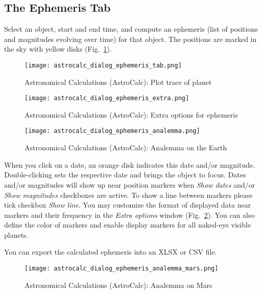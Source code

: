 \subsection{The Ephemeris Tab}
\label{sec:gui:AstroCalc:Ephemeris}

Select an object, start and end time, and compute an ephemeris (list of positions and magnitudes evolving over time) for that object. 
The positions are marked in the sky with yellow disks (Fig.~\ref{fig:gui:AstroCalc:Ephemeris}). 

\begin{figure}[p]
	\centering\texttt{[image: astrocalc\_dialog\_ephemeris\_tab.png]}
	\caption{Astronomical Calculations (AstroCalc): Plot trace of planet}
	\label{fig:gui:AstroCalc:Ephemeris}
\end{figure}

\begin{figure}[p]
	\centering\texttt{[image: astrocalc\_dialog\_ephemeris\_extra.png]}
	\caption{Astronomical Calculations (AstroCalc): Extra options for ephemeris}
	\label{fig:gui:AstroCalc:Ephemeris:Extra}
\end{figure}

\begin{figure}[p]
	\centering\texttt{[image: astrocalc\_dialog\_ephemeris\_analemma.png]}
	\caption{Astronomical Calculations (AstroCalc): Analemma on the Earth}
	\label{fig:gui:AstroCalc:Ephemeris:Analemma}
\end{figure}


When you click on a date, an orange disk indicates this date and/or magnitude. 
Double-clicking sets the respective date and brings the object to focus. 
Dates and/or magnitudes will show up near position markers when \emph{Show dates} 
and/or \emph{Show magnitudes} checkboxes are active.  
To show a line between markers please tick checkbox \emph{Show line}. 
You may customize the format of displayed data near markers and their frequency in the \emph{Extra options} window (Fig.~\ref{fig:gui:AstroCalc:Ephemeris:Extra}).
You can also define the color of markers and enable display markers for all naked-eye visible planets.

You can export the calculated ephemeris into an XLSX or CSV file. 

\begin{figure}[p]
	\centering\texttt{[image: astrocalc\_dialog\_ephemeris\_analemma\_mars.png]}
	\caption{Astronomical Calculations (AstroCalc): Analemma on Mars}
	\label{fig:gui:AstroCalc:Ephemeris:AnalemmaMars}
\end{figure}

